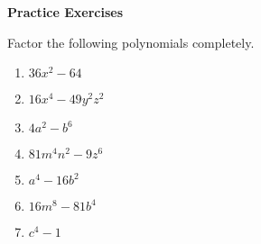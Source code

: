 \textbf{Practice Exercises}

\vspce

Factor the following polynomials completely. 

\begin{enumerate}
\item \hspce $36x^{2} - 64$
\item \hspce $16x^{4} - 49y^{2}z^{2}$
\item \hspce $4a^{2} - b^{6}$
\item \hspce $81m^{4}n^{2} - 9z^{6}$
\item \hspce $a^{4} - 16b^{2}$
\item \hspce $16m^{8} - 81b^{4}$
\item \hspce $c^{4} - 1$
\end{enumerate}